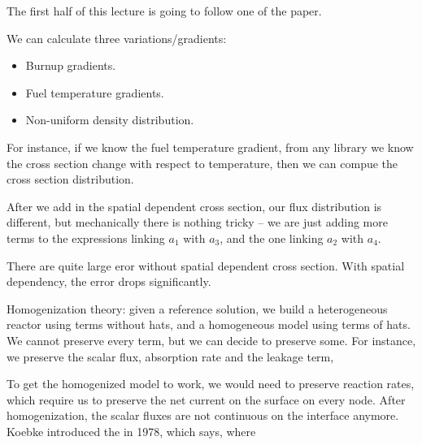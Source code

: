 \documentclass{school-22.211-notes}
\date{May  7, 2012}
\begin{document}
\maketitle

The first half of this lecture is going to follow one of the paper. 

We can calculate three variations/gradients: 
\begin{itemize}
\item Burnup gradients.
\item Fuel temperature gradients.
\item Non-uniform density distribution.
\end{itemize}
For instance, if we know the fuel temperature gradient, from any library we know the cross section change with respect to temperature, then we can compue the cross section distribution. 

After we add in the spatial dependent cross section, our flux distribution is different, but mechanically there is nothing tricky -- we are just adding more terms to the expressions linking $a_1$ with $a_3$, and the one linking $a_2$ with $a_4$. 


There are quite large eror without spatial dependent cross section. With spatial dependency, the error drops significantly. 


\clearpage
{}
Homogenization theory: given a reference solution, we build a heterogeneous reactor using terms without hats, and a homogeneous model using terms of hats. We cannot preserve every term, but we can decide to preserve some. For instance, we preserve the scalar flux, absorption rate and the leakage term, 

To get the homogenized model to work, we would need to preserve reaction rates, which require us to  preserve the net current on the surface on every node. After homogenization, the scalar fluxes are not continuous on the interface anymore. Koebke introduced the  in 1978, which says,
where
\end{document}
